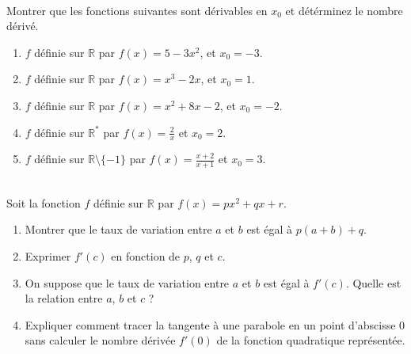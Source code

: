 \documentclass[main.tex]{subfiles}
\begin{document}
\begin{exercise}\hfill \\
 Montrer que les fonctions suivantes sont dérivables en $x_0$ et détérminez le nombre dérivé. 
	\begin{enumerate}[leftmargin=*,label=\arabic*)]
		\item   $f$ définie sur $\mathbb{R}$ par $f(x)=5-3x^2$,  et $x_0=-3$.
		\item   $f$ définie sur $\mathbb{R}$ par $f(x)=x^3-2x$,  et $x_0=1$. 
		\item   $f$ définie sur $\mathbb{R}$ par $f(x)=x^2+8x-2$,  et $x_0=-2$. 
		\item $f$ définie sur $\mathbb{R}^*$ par $f(x)=\frac{2}{x}$ et $x_0=2$.
		\item $f$ définie sur $\mathbb{R}\setminus\{-1\}$ par $f(x)=\frac{x+2}{x+1}$ et $x_0=3$.
	\end{enumerate}
\end{exercise}
\begin{problem}\hfill \\
Soit la fonction $f$ définie sur $\mathbb{R}$ par $f(x)=px^2+qx+r$.
\begin{enumerate}[leftmargin=*,label=\arabic*)]
	\item Montrer que le taux de variation entre $a$ et $b$ est égal à $p(a+b)+q$.
	\item Exprimer $f'(c)$ en fonction de $p$, $q$ et $c$.
	\item On suppose que le taux de variation entre $a$ et $b$ est égal à $f'(c)$. Quelle est la relation entre $a$, $b$ et $c$ ?
	\item Expliquer comment tracer la tangente à une parabole en un point d'abscisse $0$ sans calculer le nombre dérivée $f'(0)$ de la fonction quadratique représentée.
\end{enumerate} 
\end{problem} 
\end{document}
